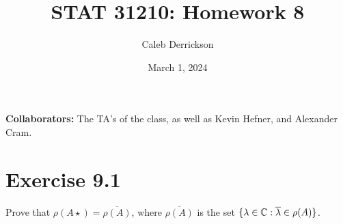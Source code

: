 

\title{STAT 31210: Homework 8}
\author{Caleb Derrickson}
\date{March 1, 2024}


\onehalfspacing
\maketitle
\allowdisplaybreaks
{\color{cit}\vspace{2mm}\noindent\textbf{Collaborators:}} The TA's of the class, as well as Kevin Hefner, and Alexander Cram.

\tableofcontents

\newpage
\section{Exercise 9.1}
Prove that $\rho(A\star) = \overline{\rho(A)}$, where $\overline{\rho(A)}$ is the set $\{\mathrm{\lambda} \in \mathbb{C} : \overline{\mathrm{\lambda}} \in \rho(A)\}$. 
\partbreak
